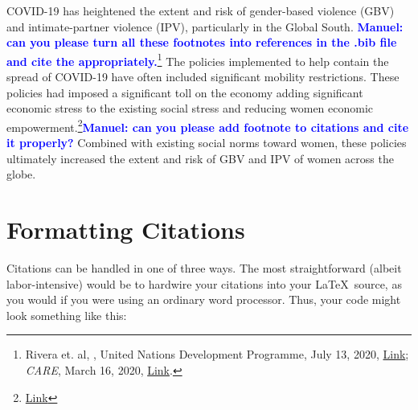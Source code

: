\documentclass[12pt]{article}
\begin{document}
% 
% 


COVID-19 has heightened the extent and risk of gender-based violence (GBV) and intimate-partner violence (IPV), particularly in the Global South. \textcolor{blue}{\bf Manuel: can you please turn all these footnotes into references in the .bib file and cite the appropriately.}\footnote{Rivera et. al, , United Nations Development Programme, July 13, 2020, \href{https://www.undp.org/content/undp/en/home/blog/2020/what-does-coronavirus-mean-for-women.html}{Link}; %
 \textit{CARE}, March 16, 2020, \href{https://care.org/wp-content/uploads/2020/07/gendered_implications_of_covid-19_-_full_paper.pdf}{Link}.} The policies implemented to help contain the spread of COVID-19 have often included significant mobility restrictions. These policies had imposed a significant toll on the economy adding significant economic stress to the existing social stress and reducing women economic empowerment.\footnote{\href{https://advances.sciencemag.org/content/7/6/eabe0997}{Link}}\textcolor{blue}{\bf Manuel: can you please add footnote to citations and cite it properly?} 
Combined with existing social norms toward women, these policies ultimately increased the extent and risk of GBV and IPV of women across the globe.





\section*{Formatting Citations}

Citations can be handled in one of three ways.  The most
straightforward (albeit labor-intensive) would be to hardwire your
citations into your \LaTeX\ source, as you would if you were using an
ordinary word processor.  Thus, your code might look something like
this:
\end{document}
